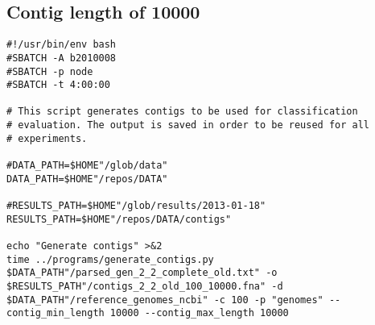 \documentclass[12pt]{article}
\begin{document}
\subsection*{Contig length of 10000}
\begin{lstlisting}[breaklines]
#!/usr/bin/env bash
#SBATCH -A b2010008
#SBATCH -p node
#SBATCH -t 4:00:00

# This script generates contigs to be used for classification 
# evaluation. The output is saved in order to be reused for all 
# experiments.

#DATA_PATH=$HOME"/glob/data"
DATA_PATH=$HOME"/repos/DATA"

#RESULTS_PATH=$HOME"/glob/results/2013-01-18"
RESULTS_PATH=$HOME"/repos/DATA/contigs"

echo "Generate contigs" >&2
time ../programs/generate_contigs.py $DATA_PATH"/parsed_gen_2_2_complete_old.txt" -o $RESULTS_PATH"/contigs_2_2_old_100_10000.fna" -d $DATA_PATH"/reference_genomes_ncbi" -c 100 -p "genomes" --contig_min_length 10000 --contig_max_length 10000

\end{lstlisting}
\end{document}
